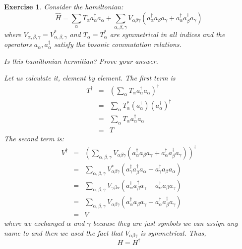 \documentclass[12pt]{article}
\def\be{\begin{equation}}
\def\ee{\end{equation}}
\def\bea{\begin{eqnarray*}}
\def\eea{\end{eqnarray*}}
\def\l{\left}
\def\r{\right}
\newtheorem{exercise}{Exercise}
\begin{document}
	
	\begin{exercise}
		Consider the hamiltonian:
		\be
			\hat{H} = \sum_\alpha T_\alpha a^\dagger_\alpha a_\alpha + \sum_{\alpha, \beta, \gamma} V_{\alpha\beta\gamma}\l( a^\dagger_\alpha a_\beta a_\gamma + a^\dagger_\alpha a^\dagger_\beta a_\gamma \r)
		\ee
		where $V_{\alpha, \beta, \gamma}=V^*_{\alpha, \beta, \gamma}$ and $T_\alpha = T^*_\alpha$ are symmetrical in all indices	and the operators $a_\alpha, a^\dagger_\alpha$ satisfy the bosonic commutation relations.
		\begin{exercises}
			\item Is this hamiltonian hermitian? Prove your answer.
			\begin{multianswer}
				Let us calculate it, element by element. The first term is
				\bea
					T^\dagger &=& \l(\sum_\alpha T_\alpha a^\dagger_\alpha a_\alpha \r)^\dagger \\
						&=& \sum_\alpha T^*_\alpha (a^\dagger_\alpha)(a^\dagger_\alpha)^\dagger \\
						&=& \sum_\alpha T_\alpha a^\dagger_\alpha a_\alpha \\
						&=& T
				\eea
				The second term is:
				\bea
					V^\dagger &=& \l(\sum_{\alpha, \beta, \gamma} V_{\alpha\beta\gamma}\l( a^\dagger_\alpha a_\beta a_\gamma + a^\dagger_\alpha a^\dagger_\beta a_\gamma \r)\r)^\dagger \\
						&=& \sum_{\alpha, \beta, \gamma} V^*_{\alpha\beta\gamma}\l( a^\dagger_\gamma a_\beta^\dagger a_\alpha + a^\dagger_\gamma a_\beta a_\alpha \r) \\
						&=& \sum_{\alpha, \beta, \gamma} V_{\gamma\beta\alpha}\l(  a^\dagger_\alpha a_\beta^\dagger a_\gamma + a^\dagger_\alpha a_\beta a_\gamma \r) \\
						&=& \sum_{\alpha, \beta, \gamma} V_{\alpha\beta\gamma}\l( a^\dagger_\alpha a_\beta a_\gamma + a^\dagger_\alpha a^\dagger_\beta a_\gamma \r) \\
						&=& V
				\eea
				where we exchanged $\alpha$ and $\gamma$ because they are just symbols we can assign any name to and then we used the fact that $V_{\alpha\beta\gamma}$ is symmetrical. Thus, 
				\be
					H = H^\dagger
				\ee
			\end{multianswer}
			

\end{exercises}
\end{exercise}
\end{document}
